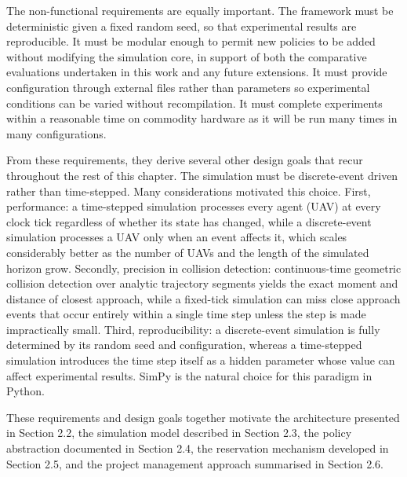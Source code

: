 \vspace{1em}

The non-functional requirements are equally important. The framework must be deterministic given a fixed random seed, so that experimental results are reproducible. It must be modular enough to permit new policies to be added without modifying the simulation core, in support of both the comparative evaluations undertaken in this work and any future extensions. It must provide configuration through external files rather than parameters so experimental conditions can be varied without recompilation. It must complete experiments within a reasonable time on commodity hardware as it will be run many times in many configurations. \par

\vspace{1em}

From these requirements, they derive several other design goals that recur throughout the rest of this chapter. The simulation must be discrete-event driven rather than time-stepped. Many considerations motivated this choice. First, performance: a time-stepped simulation processes every agent (UAV) at every clock tick regardless of whether its state has changed, while a discrete-event simulation processes a UAV only when an event affects it, which scales considerably better as the number of UAVs and the length of the simulated horizon grow. Secondly, precision in collision detection: continuous-time geometric collision detection over analytic trajectory segments yields the exact moment and distance of closest approach, while a fixed-tick simulation can miss close approach events that occur entirely within a single time step unless the step is made impractically small. Third, reproducibility: a discrete-event simulation is fully determined by its random seed and configuration, whereas a time-stepped simulation introduces the time step itself as a hidden parameter whose value can affect experimental results. SimPy \cite{simpy2024} is the natural choice for this paradigm in Python. \par

\vspace{1em}

These requirements and design goals together motivate the architecture presented in Section 2.2, the simulation model described in Section 2.3, the policy abstraction documented in Section 2.4, the reservation mechanism developed in Section 2.5, and the project management approach summarised in Section 2.6.

